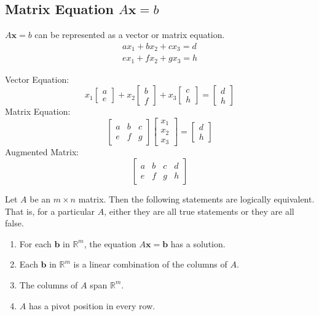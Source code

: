 \documentclass{article}
\begin{document}
\subsection*{Matrix Equation $A\mathbf{x}=b$}
$A\mathbf{x}=b$ can be represented as a vector or matrix equation.
\[\begin{split}
    ax_1+bx_2+cx_3=d \\
    ex_1+fx_2+gx_3=h
\end{split}\]

Vector Equation:
\[x_1\begin{bmatrix} a \\ e \end{bmatrix} + x_2\begin{bmatrix} b \\ f \end{bmatrix} + x_3
\begin{bmatrix} c \\ h \end{bmatrix} = \begin{bmatrix} d \\ h \end{bmatrix}\]
Matrix Equation:
\[\begin{bmatrix} a & b & c \\ e & f & g \end{bmatrix}
\begin{bmatrix} x_1 \\ x_2 \\ x_3 \end{bmatrix} = \begin{bmatrix} d \\ h \end{bmatrix}\]
Augmented Matrix:
\[\begin{bmatrix}
    a & b & c & d \\
    e & f & g & h
\end{bmatrix}\]

Let $A$ be an $m \times n$ matrix. Then the following statements are logically equivalent. That is,
for a particular $A$, either they are all true statements or they are all false.
\begin{enumerate}
    \item For each $\textbf{b}$ in $\mathbb{R}^m$, the equation $A\mathbf{x}=\mathbf{b}$ has a
    solution.
    \item Each $\textbf{b}$ in $\mathbb{R}^m$ is a linear combination of the columns of $A$.
    \item The columns of $A$ span $\mathbb{R}^m$.
    \item $A$ has a pivot position in every row.
\end{enumerate}
\end{document}
